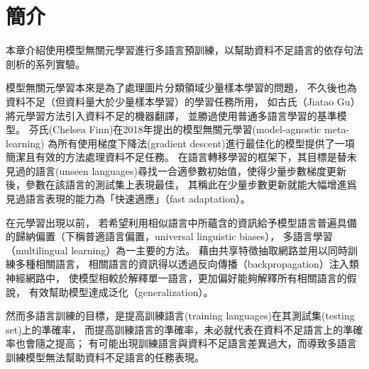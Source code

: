 \section{簡介}

\iffalse
有名的語言學家杭氏（Noam Chomsky）觀察人類習得語言的過程，
他認為嬰孩學習語言時所接收到的語言輸入是不足以讓他們習得該語言的所有特徵的，
許多特性相異的語法都可以產生這些他們所接收到的語料，
但孩童仍然習得了該語言的正確語法，
因此他推斷人類出生時大腦中即具備有某種語言習得裝置（Language acquisition device），
而語言習得裝置的任務便是從所有與語料匹配的語法中挑選正確的語法
\fi
本章介紹使用模型無關元學習進行多語言預訓練，以幫助資料不足語言的依存句法剖析的系列實驗。

模型無關元學習本來是為了處理圖片分類領域少量樣本學習的問題，
不久後也為資料不足（但資料量大於少量樣本學習）的學習任務所用，
如古氏（Jiatao Gu）將元學習方法引入資料不足的機器翻譯，
並勝過使用普通多語言學習的基準模型\cite{gu-etal-2018-meta}。
芬氏(Chelsea Finn)在2018年提出的模型無關元學習(model-agnostic meta-learning)
\cite{Finn2017ModelAgnosticMF}為所有使用梯度下降法(gradient descent)進行最佳化的模型提供了一項簡潔且有效的方法處理資料不足任務。
在語言轉移學習的框架下，其目標是替未見過的語言(unseen languages)尋找一合適參數初始值，使得少量步數梯度更新後，參數在該語言的測試集上表現最佳，
其稱此在少量步數更新就能大幅增進爲見過語言表現的能力為「快速適應」（fast adaptation）\cite{Finn2017ModelAgnosticMF}。

在元學習出現以前，
若希望利用相似語言中所蘊含的資訊給予模型語言普遍具備的歸納偏置（下稱普適語言偏置，universal linguistic biases），
多語言學習（multilingual learning）為一主要的方法\cite{caruana1997multitask}。
藉由共享特徵抽取網路並用以同時訓練多種相關語言，
相關語言的資訊得以透過反向傳播（backpropagation）注入類神經網路中，
使模型相較於解釋單一語言，更加偏好能夠解釋所有相關語言的假說，
有效幫助模型達成泛化（generalization）。

然而多語言訓練的目標，是提高訓練語言(training languages)在其測試集(testing set)上的準確率，
而提高訓練語言的準確率，未必就代表在資料不足語言上的準確率也會隨之提高；
有可能出現訓練語言與資料不足語言差異過大，而導致多語言訓練模型無法幫助資料不足語言的任務表現。

